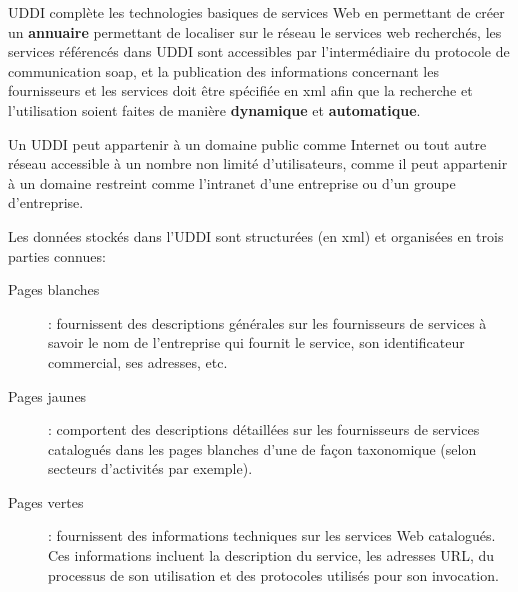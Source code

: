   \textsc{UDDI} complète les technologies basiques de services Web en
  permettant de créer un \textbf{annuaire} permettant de localiser sur
  le réseau le services web recherchés, les services référencés dans
  \textsc{UDDI} sont accessibles par l'intermédiaire du protocole de
  communication \acrshort{soap}, et la publication des informations
  concernant les fournisseurs et les services doit être spécifiée en
  \acrshort{xml} afin que la recherche et l'utilisation soient faites de
  manière \textbf{dynamique} et \textbf{automatique}.

  Un \textsc{UDDI} peut appartenir à un domaine public comme Internet
  ou tout autre réseau accessible à un nombre non limité
  d'utilisateurs, comme il peut appartenir à un domaine restreint
  comme l'intranet d'une entreprise ou d'un groupe d'entreprise.


  Les données stockés dans l'\textsc{UDDI} sont structurées (en
  \acrshort{xml}) et organisées en trois parties connues:

  \SpecialItem
  \renewcommand{\descriptionlabel}[1]{\hspace{1cm}\texttt{#1}}
  \begin{description}
    \item[Pages blanches]: fournissent des descriptions générales sur
      les fournisseurs de services à savoir le nom de l'entreprise qui
      fournit le service, son identificateur commercial, ses adresses,
      etc.

    \item[Pages jaunes]: comportent des descriptions détaillées sur
      les fournisseurs de services catalogués dans les pages blanches
      d'une de façon taxonomique (selon secteurs d'activités par
      exemple).

    \item[Pages vertes]: fournissent des informations techniques sur
      les services Web catalogués. Ces informations incluent la
      description du service, les adresses \textsc{URL}, du processus
      de son utilisation et des protocoles utilisés pour son
      invocation.
  \end{description}


